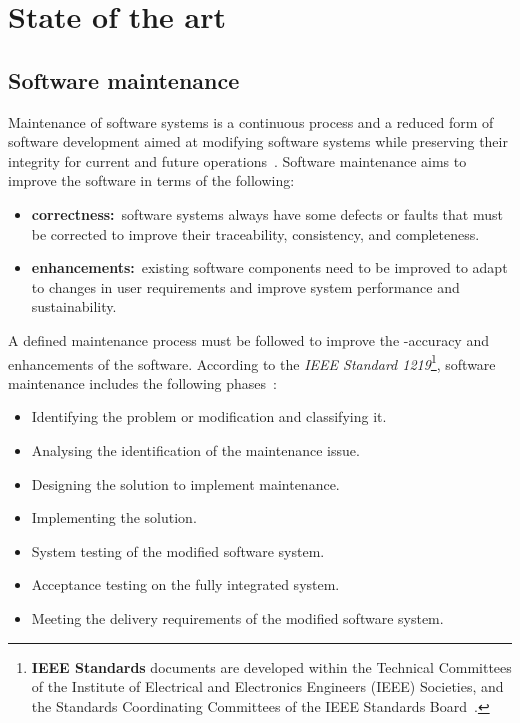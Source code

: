 \section{State of the art}\label{sec:ch1_stateOfArtSection}

\subsection{Software maintenance}\label{sec:ch1_softwareMaintenanceIntro}{}
Maintenance of software systems is a continuous process and a reduced form of software development aimed at modifying software systems while preserving their integrity for current and future operations~\cite{Sneed2004, Ackermann2009, Port2017}. Software maintenance aims to improve the software in terms of the following:

\begin{itemize}
	\item \textbf{correctness:}~software systems always have some defects or faults that must be corrected to improve their traceability, consistency, and completeness.
	\item \textbf{enhancements:}\RaggedRight~existing software components need to be improved to adapt to changes in user requirements and improve system performance and sustainability.
\end{itemize}

A defined maintenance process must be followed to improve the -accuracy and enhancements of the software. According to the \textit{IEEE Standard 1219}\footnote{\textbf{IEEE Standards} documents are developed within the Technical Committees of the Institute of Electrical and Electronics Engineers (IEEE) Societies, and the Standards Coordinating Committees of the IEEE Standards Board~\cite{Mamone1994}.}, software maintenance includes the following phases~\cite{Mamone1994, Hasan2012, Stojanov2017}:

\begin{itemize}
	\item Identifying the problem or modification and classifying it.
	\item Analysing the identification of the maintenance issue.
	\item Designing the solution to implement maintenance.
	\item Implementing the solution.
	\item System testing of the modified software system.
	\item Acceptance testing on the fully integrated system.
	\item Meeting the delivery requirements of the modified software system.
\end{itemize}

